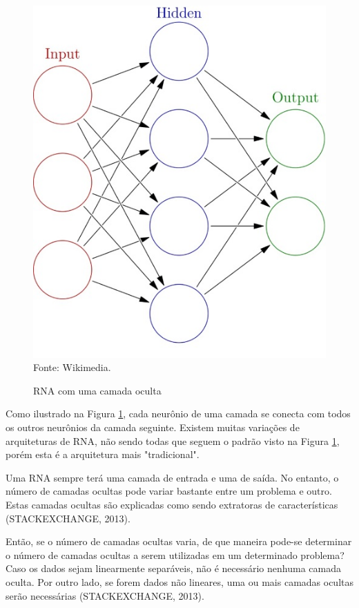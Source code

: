 \documentclass[12pt,a4paper]{article}
\newcommand{\source}[1]{\small Fonte: {#1}}
\begin{document}
	\begin{figure}[ht!]
		\caption{RNA com uma camada oculta}
		\centering
		\includegraphics[scale=0.45]{BasicNN.jpg}\\
		\vspace{0.5mm}
		\source{Wikimedia.}
		\label{fig:basicnn}
	\end{figure}
	
	Como ilustrado na Figura \ref{fig:basicnn},
	cada neurônio de uma camada se conecta com todos os outros neurônios da camada seguinte.
	Existem muitas variações de arquiteturas de RNA,
	não sendo todas que seguem o padrão visto na Figura \ref{fig:basicnn},
	porém esta é a arquitetura mais "tradicional"{}.
	
	Uma RNA sempre terá uma camada de entrada e uma de saída.
	No entanto, o número de camadas ocultas pode variar bastante entre um problema e outro.
	Estas camadas ocultas são explicadas como sendo extratoras de características
	(STACKEXCHANGE, 2013).
	
	Então, se o número de camadas ocultas varia,
	de que maneira pode-se determinar o número de camadas ocultas a serem utilizadas em um determinado problema?
	Caso os dados sejam linearmente separáveis,
	não é necessário nenhuma camada oculta.
	Por outro lado, se forem dados não lineares,
	uma ou mais camadas ocultas serão necessárias
	(STACKEXCHANGE, 2013).
	
\end{document}

